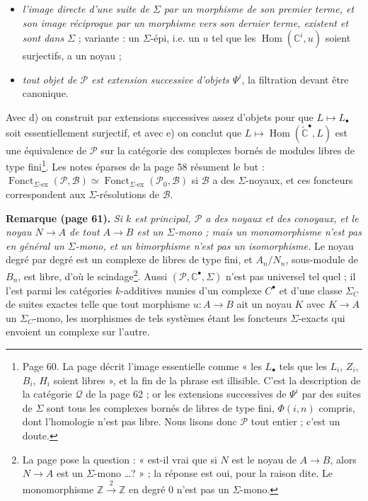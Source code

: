\documentclass[11pt,a4paper]{article}
\begin{document}
\begin{itemize}
\item[d)] \emph{l'image directe d'une suite de $\Sigma$ par un morphisme de
son premier terme, et son image réciproque par un morphisme vers son dernier
terme, existent et sont dans $\Sigma$} ; variante : un $\Sigma$-épi, i.e. un
$u$ tel que les $\operatorname{Hom}(\mathbb{C}^{i}, u)$ soient surjectifs,
a un noyau ;
\item[e)] \emph{tout objet de $\mathcal{P}$ est extension successive
d'objets $\Psi^{i}$}, la filtration devant être canonique.
\end{itemize}
Avec d) on construit par extensions successives assez d'objets pour que
$L \mapsto L_{\bullet}$ soit essentiellement surjectif, et avec e) on conclut
que $L \mapsto \operatorname{Hom}(\widetilde{\mathbb{C}}^{\bullet}, L)$ est
une équivalence de $\mathcal{P}$ sur la catégorie des complexes bornés de
modules libres de type fini\footnote{Page 60. La page décrit l'image
essentielle comme « les $L_{\bullet}$ tels que les $L_{i}$, $Z_{i}$, $B_{i}$,
$H_{i}$ soient libres », et la fin de la phrase est illisible. C'est la
description de la catégorie $\mathcal{Q}$ de la page 62 ; or les extensions
successives de $\Psi^{i}$ par des suites de $\Sigma$ sont tous les complexes
bornés de libres de type fini, $\Phi(i,n)$ compris, dont l'homologie n'est
pas libre. Nous lisons donc $\mathcal{P}$ tout entier ; c'est un doute.}.
Les notes éparses de la page 58 résument le but : $\operatorname{Fonct}_{\Sigma\text{-ex}}(\mathcal{P},
\mathcal{B}) \simeq \operatorname{Fonct}_{\Sigma\text{-ex}}(\mathcal{P}_{0},
\mathcal{B})$ si $\mathcal{B}$ a des $\Sigma$-noyaux, et ces foncteurs
correspondent aux $\Sigma$-résolutions de $\mathcal{B}$.

\textbf{Remarque (page 61).} \emph{Si $k$ est principal, $\mathcal{P}$ a des
noyaux et des conoyaux, et le noyau $N \to A$ de tout $A \to B$ est un
$\Sigma$-mono ; mais un monomorphisme n'est pas en général un $\Sigma$-mono,
et un bimorphisme n'est pas un isomorphisme.} Le noyau degré par degré est un
complexe de libres de type fini, et $A_{n}/N_{n}$, sous-module de $B_{n}$, est
libre, d'où le scindage\footnote{La page pose la question : « est-il vrai
que si $N$ est le noyau de $A \to B$, alors $N \to A$ est un $\Sigma$-mono
\ldots ? » ; la réponse est oui, pour la raison dite. Le monomorphisme
$\mathbb{Z} \xrightarrow{2} \mathbb{Z}$ en degré $0$ n'est pas un
$\Sigma$-mono.}. Aussi $(\mathcal{P}, \mathbb{C}^{\bullet}, \Sigma)$ n'est
pas universel tel quel ; il l'est parmi les catégories $k$-additives munies
d'un complexe $C^{\bullet}$ et d'une classe $\Sigma_{C}$ de suites exactes
telle que tout morphisme $u : A \to B$ ait un noyau $K$ avec $K \to A$ un
$\Sigma_{C}$-mono, les morphismes de tels systèmes étant les foncteurs
$\Sigma$-exacts qui envoient un complexe sur l'autre.
\end{document}
